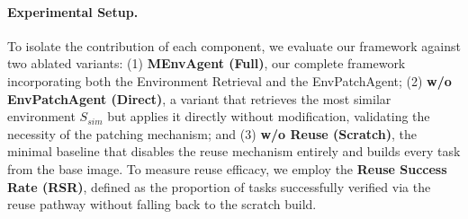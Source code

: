 \documentclass{article}
\theoremstyle{plain}
\theoremstyle{definition}
\theoremstyle{remark}
\begin{document}
\paragraph{Experimental Setup.}
To isolate the contribution of each component, we evaluate our framework against two ablated variants:
(1) \textbf{MEnvAgent (Full)}, our complete framework incorporating both the Environment Retrieval and the EnvPatchAgent;
(2) \textbf{w/o EnvPatchAgent (Direct)}, a variant that retrieves the most similar environment $S_{sim}$ but applies it directly without modification, validating the necessity of the patching mechanism; and
(3) \textbf{w/o Reuse (Scratch)}, the minimal baseline that disables the reuse mechanism entirely and builds every task from the base image.
To measure reuse efficacy, we employ the \textbf{Reuse Success Rate (RSR)}, defined as the proportion of tasks successfully verified via the reuse pathway without falling back to the scratch build.

    
    
\end{document}
